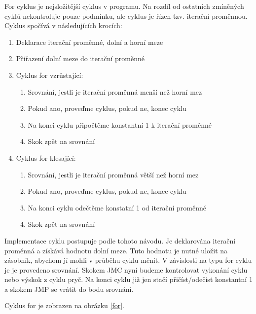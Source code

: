 \documentclass[
12pt,
a4paper,
pdftex,
czech,
titlepage
]{report}
\begin{document}
For cyklus je nejsložitější cyklus v programu. Na rozdíl od ostatních zmíněných cyklů nekontroluje pouze podmínku, ale cyklus je řízen tzv. iterační proměnnou. Cyklus spočívá v následujících krocích:
\begin{enumerate}
\item Deklarace iterační proměnné, dolní a horní meze
\item Přiřazení dolní meze do iterační proměnné
\item Cyklus for vzrůstající:
\begin{enumerate}
\item Srovnání, jestli je iterační proměnná menší než horní mez
\item Pokud ano, proveďme cyklus, pokud ne, konec cyklu
\item Na konci cyklu připočtěme konstantní 1 k iterační proměnné
\item Skok zpět na srovnání
\end{enumerate}
\item Cyklus for klesající:
\begin{enumerate}
\item Srovnání, jestli je iterační proměnná větší než horní mez
\item Pokud ano, proveďme cyklus, pokud ne, konec cyklu
\item Na konci cyklu odečtěme konstatní 1 od iterační proměnné
\item Skok zpět na srovnání
\end{enumerate}
\end{enumerate}

Implementace cyklu postupuje podle tohoto návodu. Je deklarována iterační proměnná a získává hodnotu dolní meze. Tuto hodnotu je nutné uložit na zásobník, abychom jí mohli v průběhu cyklu měnit. V závislosti na typu for cyklu je je provedeno srovnání. Skokem JMC nyní budeme kontrolovat vykonání cyklu nebo výskok z cyklu pryč. Na konci cyklu již jen stačí přičíst/odečíst konstantní 1 a skokem JMP se vrátit do bodu srovnání.

Cyklus for je zobrazen na obrázku \ref{for}.
\end{document}
